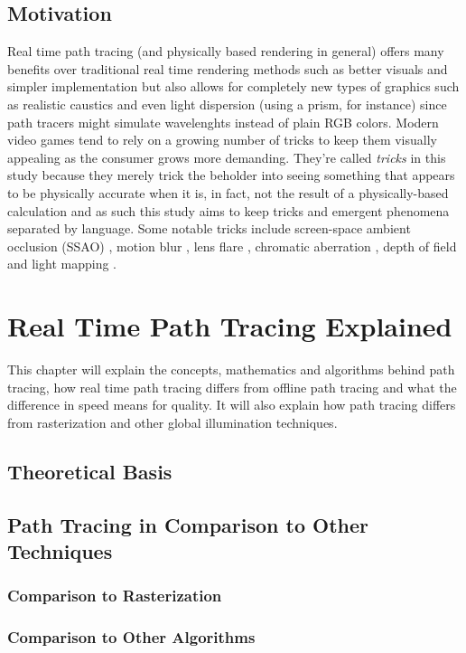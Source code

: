 \documentclass[
  twoside,
  11pt, a4paper,
  footinclude=true,
  headinclude=true,
  cleardoublepage=empty
]{scrreprt}
\begin{document}
\section{Motivation}
Real time path tracing (and physically based rendering in general) offers many
benefits over traditional real time rendering methods such as better visuals
and simpler implementation but also allows for completely new types of graphics
such as realistic caustics \cite{wiki:caustics} and even light dispersion
\cite{wiki:dispersion} (using a prism, for instance) since path tracers might simulate wavelenghts
instead of plain RGB colors. Modern video games tend
to rely on a growing number of tricks to keep them visually appealing as the
consumer grows more demanding. They're called \textit{tricks} in this study
because they merely trick the beholder into seeing something that appears to be
physically accurate when it is, in fact, not the result of a physically-based
calculation and as such this study aims to keep tricks and emergent phenomena
separated by language. Some notable tricks include screen-space ambient occlusion (SSAO)
\cite{wiki:ssao}, motion blur \cite{wiki:motion-blur}, lens flare
\cite{wiki:lens-flare}, chromatic aberration \cite{wiki:chromatic-aberration},
depth of field \cite{wiki:depth-of-field} and light mapping \cite{wiki:lightmap}.

\chapter{Real Time Path Tracing Explained}
This chapter will explain the concepts, mathematics and algorithms behind path tracing, how real
time path tracing differs from offline path tracing and what the difference in speed means for
quality. It will also explain how path tracing differs from rasterization and other global
illumination techniques.

\section{Theoretical Basis}
\lipsum[1]

\section{Path Tracing in Comparison to Other Techniques}
\subsection{Comparison to Rasterization}
\subsection{Comparison to Other Algorithms}
\end{document}
